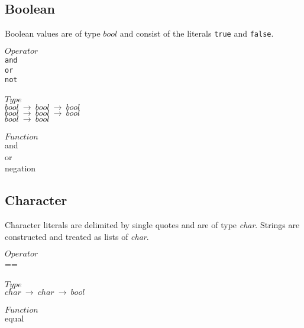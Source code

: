 ﻿\documentclass[5pt]{article}
\begin{document}
\subsection{Boolean}
Boolean values are of type $bool$ and consist of the literals \texttt{true} and \texttt{false}. 
\begin{multicols}{3}
\noindent $Operator$ \\
\hspace*{5mm} \texttt{and} \\
\hspace*{5mm} \texttt{or} \\
\hspace*{5mm} \texttt{not} \\
\columnbreak \\
\noindent $Type$ \\
$bool \ \rightarrow \ bool \ \rightarrow \ bool $ \\
$bool \ \rightarrow \ bool \ \rightarrow \ bool $ \\
$bool \ \rightarrow \ bool $ \\
\columnbreak \\
\noindent $Function$ \\
and \\
or \\
negation \\
\end{multicols}
\subsection{Character}
Character literals are delimited by single quotes and are of type \textit{char}. 
Strings are constructed and treated as lists of \textit{char}.
\begin{multicols}{3}
\noindent $Operator$ \\
\hspace*{5mm} == \\
\columnbreak \\
\noindent $Type$ \\
$char \ \rightarrow \ char \ \rightarrow \ bool $ \\
\columnbreak \\
\noindent $Function$ \\
equal \\
\end{multicols}
\pagebreak
\end{document}
